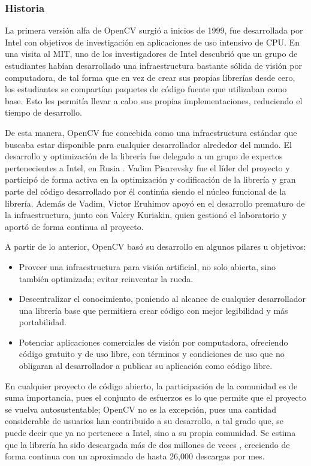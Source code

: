\subsubsection{Historia}
La primera versión alfa de OpenCV surgió a inicios de 1999, fue desarrollada por Intel con objetivos de investigación en aplicaciones de uso intensivo de CPU. En una visita al MIT, uno de los investigadores de Intel descubrió que un grupo de estudiantes habían desarrollado una infraestructura bastante sólida de visión por computadora, de tal forma que en vez de crear sus propias librerías desde cero, los estudiantes se compartían paquetes de código fuente que utilizaban como base. Esto les permitía llevar a cabo sus propias implementaciones, reduciendo el tiempo de desarrollo. 

De esta manera, OpenCV fue concebida como una infraestructura estándar que buscaba estar disponible para cualquier desarrollador alrededor del mundo. El desarrollo y optimización de la librería fue delegado a un grupo de expertos pertenecientes a Intel, en Rusia \cite{bradski2008learning}. Vadim Pisarevsky fue el líder del proyecto y participó de forma activa en la optimización y codificación de la librería y gran parte del código desarrollado por él continúa siendo el núcleo funcional de la librería. Además de Vadim, Victor Eruhimov apoyó en el desarrollo prematuro de la infraestructura, junto con Valery Kuriakin, quien gestionó el laboratorio y aportó de forma continua al proyecto. 

A partir de lo anterior, OpenCV basó su desarrollo en algunos pilares u objetivos:

\begin{itemize}
    \item Proveer una infraestructura para visión artificial, no solo abierta, sino también optimizada; evitar reinventar la rueda.
    \item Descentralizar el conocimiento, poniendo al alcance de cualquier desarrollador una librería base que permitiera crear código con mejor legibilidad y más portabilidad.
    \item Potenciar aplicaciones comerciales de visión por computadora, ofreciendo código gratuito y de uso libre, con términos y condiciones de uso que no obligaran al desarrollador a publicar su aplicación como código libre.
\end{itemize}

En cualquier proyecto de código abierto, la participación de la comunidad es de suma importancia, pues el conjunto de esfuerzos es lo que permite que el proyecto se vuelva autosustentable; OpenCV no es la excepción, pues una cantidad considerable de usuarios han contribuido a su desarrollo, a tal grado que, se puede decir que ya no pertenece a Intel, sino a su propia comunidad. Se estima que la librería ha sido descargada más de dos millones de veces \cite{bradski2008learning}, creciendo de forma continua con un aproximado de hasta 26,000 descargas por mes. 


